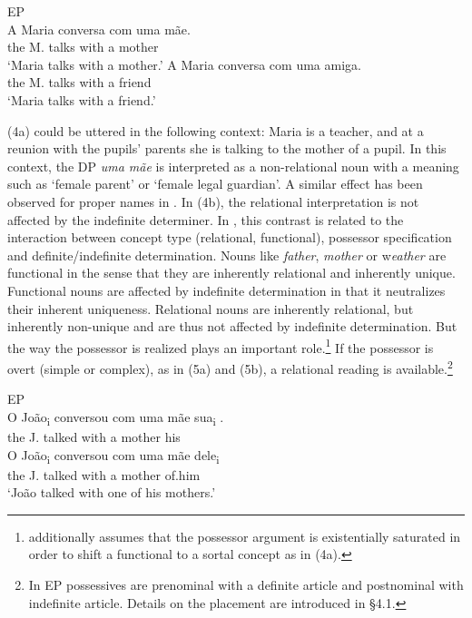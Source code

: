 \documentclass[output=paper]{langsci/langscibook}
\begin{document}
\ea%
    EP\label{ex:wein:4}\\
    \ea 
    \gll A Maria conversa com uma mãe.\\
         the M. talks with a mother\\
    \glt ‘Maria talks with a mother.’
    \ex  
    \gll A Maria conversa com uma amiga.\\
         the M. talks with a friend\\
    \glt ‘Maria talks with a friend.’
    \z
\z

(4a) could be uttered in the following context: Maria is a teacher, and at a reunion with the pupils’ parents she is talking to the mother of a pupil. In this context, the DP \textit{uma mãe} is interpreted as a non-relational noun with a meaning such as ‘female parent’ or ‘female legal guardian’. A similar effect has been observed for proper names in \citet{Longobardi1994}. In (4b), the relational interpretation is not affected by the indefinite determiner. In \citet{Löbner2011}, this contrast is related to the interaction between concept type (relational, functional), possessor specification and definite\slash indefinite determination. Nouns like \textit{father}, \textit{mother} or w\textit{eather} are functional in the sense that they are inherently relational and inherently unique. Functional nouns are affected by indefinite determination in that it neutralizes their inherent uniqueness. Relational nouns are inherently relational, but inherently non-unique and are thus not affected by indefinite determination. But the way the possessor is realized plays an important role.\footnote{\citet{Löbner2011} additionally assumes that the possessor argument is existentially saturated in order to shift a functional to a sortal concept as in (4a).} If the possessor is overt (simple or complex), as in (5a) and (5b), a relational reading is available.\footnote{In EP possessives are prenominal with a definite article and postnominal with indefinite article. Details on the placement are introduced in §4.1.}

\ea%
    EP\label{ex:wein:5}\\
    \ea
    \gll O João\textsubscript{i} conversou com uma mãe sua\textsubscript{i} .  \\
         the J.   talked   with a mother his\\
    \ex  
    \gll O João\textsubscript{i} conversou com uma mãe dele\textsubscript{i} \\
         the J. talked    with a mother of.him \\
    \glt ‘João talked with one of his mothers.’ 
    \z
\z
\end{document}
